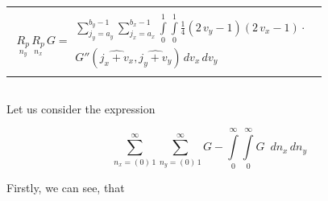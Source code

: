 \documentclass[twoside, 10pt, ptm]{article}
\def\myvspacebeforesubsection{-2.0mm}
\def\myvspaceaftersubsection{-2.5mm}
\begin{document}
\begin{multicols}{2}
\begin{center}
\begin{tabular}{ l }


$\begin{array}{lr}
\underset{n_y}{R_{p}}\,\underset{n_x}{R_{p}}\,G =
\begin{array}{c}
 \sum\limits_{j_{y}=a_{y}}^{b_{y} - 1} \sum\limits_{j_{x}=a_{x}}^{b_{x} - 1} \int\limits_{0}^{1} \int\limits_{0}^{1}\frac{1}{4} \left(2 \, v_{y} - 1\right)  \left(2 \, v_{x} - 1\right) \cdot \\
G''\left(\widehat{j_{x} + v_{x}}, \widehat{j_{y} + v_{y}}\right)\,{d v_{x}}\,{d v_{y}}
\end{array}
\end{array}$ \\



\end{tabular}
\end{center}


\vspace{\myvspacebeforesubsection}
    \subsection*{}\label{a-way-of-calculating-deltaleftevright}
\vspace{\myvspaceaftersubsection}


    Let us consider the expression

\begin{equation} \label{eq:12}
\sum\limits_{n_x=\left(0\right)\,1}^{\infty}
\sum\limits_{n_y=\left(0\right)\,1}^{\infty}
G%
-
\int\limits_{0}^{\infty}
\int\limits_{0}^{\infty}
G%
\,\,\,d{n_x}\,d{n_y}
\end{equation}

    Firstly, we can see, that


\end{multicols}
\end{document}
